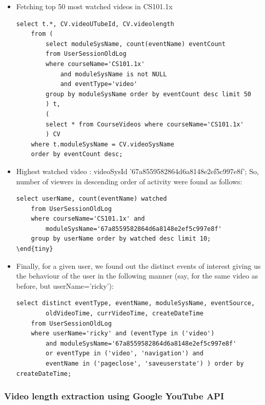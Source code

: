 \documentclass[16pt]{report}
\begin{document}
\begin{itemize}

\item Fetching top 50 most watched videos in CS101.1x
\begin{verbatim}
select t.*, CV.videoUTubeId, CV.videolength
	from ( 	
		select moduleSysName, count(eventName) eventCount
		from UserSessionOldLog
		where courseName='CS101.1x' 
			and moduleSysName is not NULL
			and eventType='video'
		group by moduleSysName order by eventCount desc limit 50
		) t,
		(
		select * from CourseVideos where courseName='CS101.1x'
		) CV
	where t.moduleSysName = CV.videoSysName
	order by eventCount desc;
\end{verbatim}


\item Highest watched video : videoSysId '67a8559582864d6a8148e2ef5c997e8f'; So, number of viewers in descending order of activity were found as follows:

\begin{verbatim}
select userName, count(eventName) watched
	from UserSessionOldLog
	where courseName='CS101.1x' and
		moduleSysName='67a8559582864d6a8148e2ef5c997e8f'
	group by userName order by watched desc limit 10;
\end{tiny}

\end{verbatim}

\item Finally, for a given user, we found out the distinct events of interest giving us the behaviour of the user in the following manner (say, for the same video as before, but userName='ricky'):

\begin{verbatim}
select distinct	eventType, eventName, moduleSysName, eventSource, 
		oldVideoTime, currVideoTime, createDateTime 
	from UserSessionOldLog 
	where userName='ricky' and (eventType in ('video') 
		and moduleSysName='67a8559582864d6a8148e2ef5c997e8f' 
		or eventType in ('video', 'navigation') and 
		eventName in ('pageclose', 'saveuserstate') ) order by createDateTime;
\end{verbatim}


\end{itemize}





\subsubsection{Video length extraction using Google YouTube API}
\end{document}
